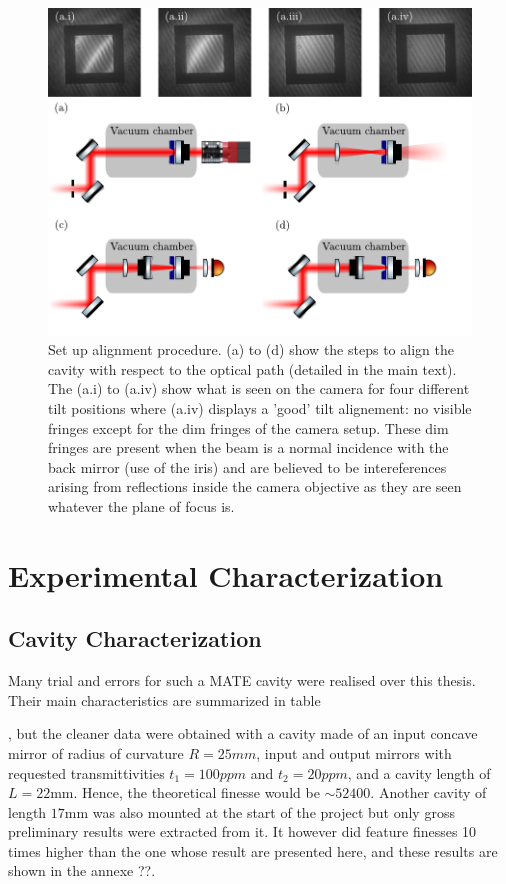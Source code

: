 \begin{figure}[h!]
    \centering  
    \includegraphics[width=\textwidth]{./chap5/fig/tilt_alignementB.pdf}
    \caption{Set up alignment procedure. (a) to (d) show the steps to align the cavity with respect to the optical path (detailed in the main text). The (a.i) to (a.iv) show what is seen on the camera for four different tilt positions where (a.iv) displays a 'good' tilt alignement: no visible fringes except for the dim fringes of the camera setup. These dim fringes are present when the beam is a normal incidence with the back mirror (use of the iris) and are believed to be intereferences arising from reflections inside the camera objective as they are seen whatever the plane of focus is. }
    \label{fig:tilt}
\end{figure}
\section{Experimental Characterization}
\subsection{Cavity Characterization}

Many trial and errors for such a MATE cavity were realised over this thesis. Their main characteristics are summarized in table 


, but the cleaner data were obtained with a cavity made of an input concave mirror of radius of curvature $R=25mm$, input and output mirrors with requested transmittivities $t_1=100ppm$ and $t_2=20ppm$, and a cavity length of $L=22$mm. Hence, the theoretical finesse would be $\sim 52400$. Another cavity of length $17$mm was also mounted at the start of the project but only gross preliminary results were extracted from it. It however did feature finesses 10 times higher than the one whose result are presented here, and these results are shown in the annexe ??. 


